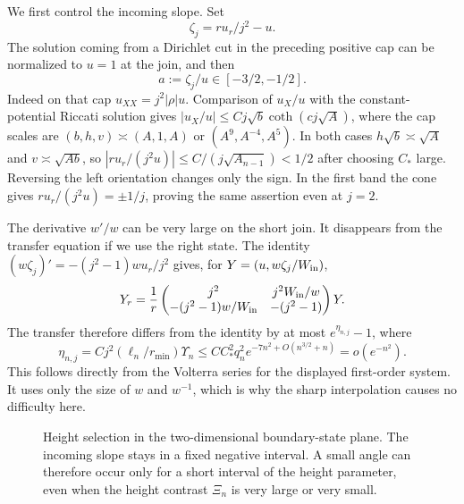 We first control the incoming slope.  Set
\begin{equation}\label{eq:rad-eq-js5}
 \zeta_j=ru_r/j^2-u.
\end{equation}
The solution coming from a Dirichlet cut in the preceding positive cap
can be normalized to $u=1$ at the join, and then
\begin{equation}\label{eq:rad-eq-js6}
 a:=\zeta_j/u\in[-3/2,-1/2].
\end{equation}
Indeed on that cap $u_{XX}=j^2|\rho|u$.
Comparison of $u_X/u$ with the constant-potential Riccati solution
gives
$|u_X/u|\le Cj\sqrt b\coth(cj\sqrt A)$, where the cap scales are
$(b,h,v)\asymp(A,1,A)$ or $(A^9,A^{-4},A^5)$.
In both cases $h\sqrt b\asymp\sqrt A$ and
$v\asymp\sqrt{Ab}$, so
$|ru_r/(j^2u)|\le C/(j\sqrt{A_{n-1}})<1/2$ after choosing $C_*$
large.  Reversing the left orientation changes only the sign.
In the first band the cone gives $ru_r/(j^2u)=\pm1/j$, proving the
same assertion even at $j=2$.

The derivative $w'/w$ can be very large on the short join.  It disappears
from the transfer equation if we use the right state.  The identity
$(w\zeta_j)'=-(j^2-1)wu_r/j^2$ gives, for
$Y=(u,w\zeta_j/W_{\rm in})$,
\begin{equation}\label{eq:rad-eq-js7}
 Y_r=\frac1r
 \begin{pmatrix}
 j^2&j^2W_{\rm in}/w\\
 -(j^2-1)w/W_{\rm in}&-(j^2-1)
 \end{pmatrix}Y.
\end{equation}
The transfer therefore differs from the identity by at most
$e^{\eta_{n,j}}-1$, where
\begin{equation}\label{eq:rad-eq-js14}
 \eta_{n,j}=Cj^2(\ell_n/r_{\min})\Upsilon_n
 \le CC_*^2q_n^2e^{-7n^2+O(n^{3/2}+n)}=o(e^{-n^2}).
\end{equation}
This follows directly from the Volterra series for the displayed
first-order system.  It uses only the size of $w$ and $w^{-1}$,
which is why the sharp interpolation causes no difficulty here.

\begin{figure}[htbp]
\centering
{}
\caption{Height selection in the two-dimensional boundary-state plane.
The incoming slope stays in a fixed negative interval.  A small angle
can therefore occur only for a short interval of the height parameter,
even when the height contrast $\Xi_n$ is very large or very small.}
\label{fig:height-selection}
\end{figure}

